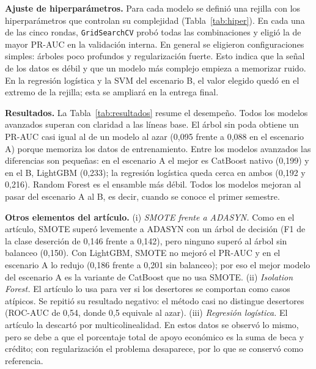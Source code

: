 \documentclass[11pt,a4paper]{article}
\begin{document}
\textbf{Ajuste de hiperparámetros.} Para cada modelo se definió una rejilla con los hiperparámetros que controlan su complejidad (Tabla~\ref{tab:hiper}). En cada una de las cinco rondas, \texttt{GridSearchCV} probó todas las combinaciones y eligió la de mayor PR-AUC en la validación interna. En general se eligieron configuraciones simples: árboles poco profundos y regularización fuerte. Esto indica que la señal de los datos es débil y que un modelo más complejo empieza a memorizar ruido. En la regresión logística y la SVM del escenario B, el valor elegido quedó en el extremo de la rejilla; esta se ampliará en la entrega final.

\begin{table}[H]
\centering
\footnotesize
\caption{Hiperparámetros explorados y valor elegido con más frecuencia en las cinco rondas. $^{\dagger}$CatBoost sin SMOTE, con pesos de clase.}
\label{tab:hiper}

\end{table}

\textbf{Resultados.} La Tabla~\ref{tab:resultados} resume el desempeño. Todos los modelos avanzados superan con claridad a las líneas base. El árbol sin poda obtiene un PR-AUC casi igual al de un modelo al azar (0,095 frente a 0,088 en el escenario A) porque memoriza los datos de entrenamiento. Entre los modelos avanzados las diferencias son pequeñas: en el escenario A el mejor es CatBoost nativo (0,199) y en el B, LightGBM (0,233); la regresión logística queda cerca en ambos (0,192 y 0,216). Random Forest es el ensamble más débil. Todos los modelos mejoran al pasar del escenario A al B, es decir, cuando se conoce el primer semestre.

\begin{table}[H]
\centering
\footnotesize
\caption{Resultados de la validación cruzada anidada: PR-AUC (promedio $\pm$ desviación estándar de las cinco rondas), \textit{recall} y precisión con el umbral elegido. En negrita, el mejor PR-AUC entre los modelos avanzados.}
\label{tab:resultados}

\end{table}

\textbf{Otros elementos del artículo.} (i) \emph{SMOTE frente a ADASYN.} Como en el artículo, SMOTE superó levemente a ADASYN con un árbol de decisión (F1 de la clase deserción de 0,146 frente a 0,142), pero ninguno superó al árbol sin balanceo (0,150). Con LightGBM, SMOTE no mejoró el PR-AUC y en el escenario A lo redujo (0,186 frente a 0,201 sin balanceo); por eso el mejor modelo del escenario A es la variante de CatBoost que no usa SMOTE. (ii) \emph{Isolation Forest.} El artículo lo usa para ver si los desertores se comportan como casos atípicos. Se repitió su resultado negativo: el método casi no distingue desertores (ROC-AUC de 0,54, donde 0,5 equivale al azar). (iii) \emph{Regresión logística.} El artículo la descartó por multicolinealidad. En estos datos se observó lo mismo, pero se debe a que el porcentaje total de apoyo económico es la suma de beca y crédito; con regularización el problema desaparece, por lo que se conservó como referencia.
\end{document}
